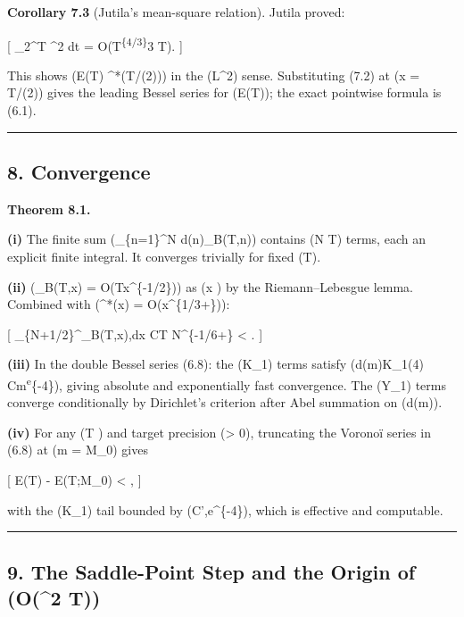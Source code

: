 \documentclass[
]{article}
\begin{document}
\textbf{Corollary 7.3} (Jutila's mean-square relation). Jutila proved:

{[} \int\_2\^{}T
\^{}2 dt =
O(T\textsuperscript{\{4/3\}\log}3 T). {]}

This shows (E(T) \pi\Delta\^{}*(T/(2\pi))) in the (L\^{}2)
sense. Substituting (7.2) at (x = T/(2\pi)) gives the leading Bessel
series for (E(T)); the exact pointwise formula is (6.1).

\begin{center}\rule{0.5\linewidth}{0.5pt}\end{center}

\subsection{8. Convergence}\label{convergence}

\textbf{Theorem 8.1.}

\textbf{(i)} The finite sum (\sum\_\{n=1\}\^{}N d(n)\Psi\_B(T,n))
contains (N \asymp T) terms, each an explicit finite integral. It
converges trivially for fixed (T).

\textbf{(ii)} (\Xi\_B(T,x) = O(Tx\^{}\{-1/2\})) as (x \to \infty) by the
Riemann--Lebesgue lemma. Combined with (\Delta\^{}*(x) =
O(x\^{}\{1/3+\varepsilon\})):

{[}
\int\_\{N+1/2\}\^{}\infty {}\textbar{}\Xi\_B(T,x)\textbar,dx
\le CT N\^{}\{-1/6+\varepsilon\} \textless{} \infty. {]}

\textbf{(iii)} In the double Bessel series (6.8): the (K\_1) terms
satisfy (\textbar d(m)K\_1(4\pi{})\textbar{}
\le Cm\textsuperscript{\varepsilon e}\{-4\pi{}\}), giving
absolute and exponentially fast convergence. The (Y\_1) terms converge
conditionally by Dirichlet's criterion after Abel summation on (d(m)).

\textbf{(iv)} For any (T ) and target precision
(\delta \textgreater{} 0), truncating the Voronoï series in (6.8) at (m
= M\_0) gives

{[} \textbar E(T) - E(T;M\_0)\textbar{} \textless{} \delta, {]}

with the (K\_1) tail bounded by (C',e\^{}\{-4\pi{}\}),
which is effective and computable.

\begin{center}\rule{0.5\linewidth}{0.5pt}\end{center}

\subsection{\texorpdfstring{9. The Saddle-Point Step and the Origin of
(O(\log\^{}2
T))}{9. The Saddle-Point Step and the Origin of (O(\^{}2 T))}}\label{the-saddle-point-step-and-the-origin-of-o2-t}
\end{document}
